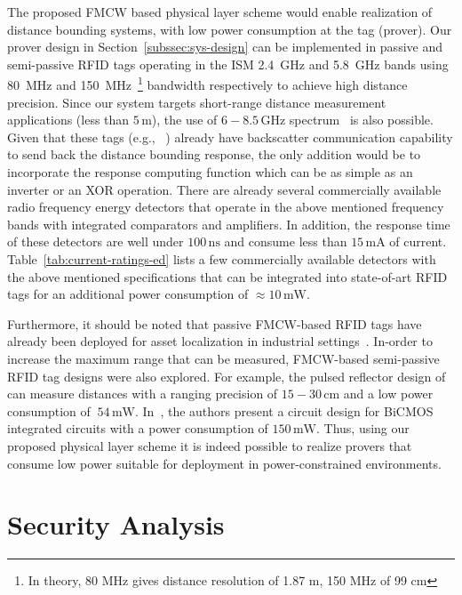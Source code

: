 \documentclass{sig-alternate-10pt}
\newcommand{\eg}{e.g.,\xspace}
\newcommand{\unit}[1]{\ensuremath{\, \mathrm{#1}}}
\begin{document}
The proposed FMCW based physical layer scheme would enable realization of
distance bounding systems, with low power consumption at the tag (prover). Our
prover design in Section~\ref{subssec:sys-design} can be implemented in passive
and semi-passive RFID tags operating in the ISM 2.4~GHz and 5.8~GHz bands using
80~MHz and 150~MHz~\footnote{In theory, 80 MHz gives distance resolution of 1.87
  m, 150 MHz of 99 cm} bandwidth respectively to achieve high distance
precision. Since our system targets short-range distance measurement
applications (less than $5\unit{m}$), the use of $6-8.5\unit{GHz}$
spectrum~\cite{hirt2007european} is also possible. Given that these tags (\eg
~\cite{dardari2008passive,d2012uwb,seetharam2007battery}) already have
backscatter communication capability to send back the distance bounding
response, the only addition would be to incorporate the response computing
function which can be as simple as an inverter or an XOR operation. There are
already several commercially available radio frequency energy detectors that
operate in the above mentioned frequency bands with integrated comparators and
amplifiers. In addition, the response time of these detectors are well under
$100\unit{ns}$ and consume less than $15\unit{mA}$ of current.
Table~\ref{tab:current-ratings-ed} lists a few commercially available detectors
with the above mentioned specifications that can be integrated into state-of-art
RFID tags for an additional power consumption of $\approx 10\unit{mW}$.

Furthermore, it should be noted that passive FMCW-based RFID tags have already
been deployed for asset localization in industrial settings~\cite{symeo}.
In-order to increase the maximum range that can be measured, FMCW-based
semi-passive RFID tag designs were also explored. For example, the pulsed
reflector design of~\cite{WehrliFeb10} can measure distances with a ranging
precision of $15-30\unit{cm}$ and a low power consumption of $~54\unit{mW}$.
In~\cite{StrobelSep11}, the authors present a circuit design for BiCMOS
integrated circuits with a power consumption of $150\unit{mW}$. Thus, using our
proposed physical layer scheme it is indeed possible to realize provers that
consume low power suitable for deployment in power-constrained environments.

\section{Security Analysis}
\label{sec:security-analysis}
\end{document}
